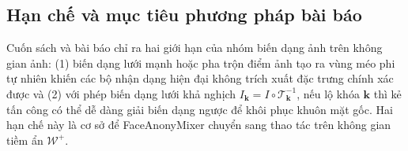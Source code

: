 \subsection*{Hạn chế và mục tiêu phương pháp bài báo}
Cuốn sách và bài báo chỉ ra hai giới hạn của nhóm biến dạng ảnh trên không gian ảnh: (1) biến dạng lưới mạnh hoặc pha trộn điểm ảnh tạo ra vùng méo phi tự nhiên khiến các bộ nhận dạng hiện đại không trích xuất đặc trưng chính xác được và (2) với phép biến dạng lưới khả nghịch $I_{\mathbf{k}} = I \circ \mathcal{T}_{\mathbf{k}}^{-1}$, nếu lộ khóa $\mathbf{k}$ thì kẻ tấn công có thể dễ dàng giải biến dạng ngược để khôi phục khuôn mặt gốc. Hai hạn chế này là cơ sở để FaceAnonyMixer chuyển sang thao tác trên không gian tiềm ẩn $\mathcal{W}^+$.
\par
\endgroup
